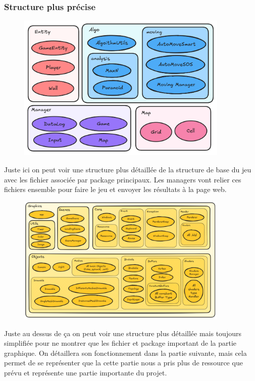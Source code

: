 \subsubsection{Structure plus précise}
\begin{figure}
	\centering
	
		\includegraphics[width=0.9\textwidth]{images/ExcalidrawBase.png}
	
	\label{fig:game}
\end{figure}
Juste ici on peut voir une structure plus détaillée de la structure de base du jeu avec les fichier associée par package principaux.
Les managers vont relier ces fichiers ensemble pour faire le jeu et envoyer les résultats à la page web.
\begin{figure}
	\centering
	
		\includegraphics[width=0.9\textwidth]{images/ExcalidrawGraphics.png}
	
	\label{fig:game}
\end{figure}
Juste au dessus de ça on peut voir une structure plus détaillée mais toujours simplifiée pour ne montrer que les fichier et package important de la partie graphique. 
On détaillera son fonctionnement dans la partie suivante, mais cela permet de se représenter que la cette partie nous a pris plus de ressource que prévu et représente une partie importante du projet.



